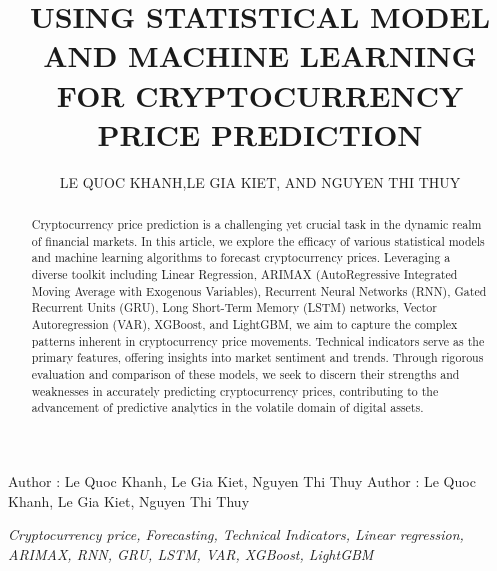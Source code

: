 \documentclass{ieeeojies}
\begin{document}
\title{\centering USING STATISTICAL MODEL AND MACHINE LEARNING FOR CRYPTOCURRENCY PRICE PREDICTION}

\author{\uppercase{Le Quoc Khanh},\uppercase{Le Gia Kiet, and Nguyen Thi Thuy}}

\address[1]{Faculty of Information Systems, University of Information Technology, (e-mail: 21520283@gm.uit.edu.vn)}
\address[2]{Faculty of Information Systems, University of Information Technology, (e-mail: 21522255@gm.uit.edu.vn)}
\address[3]{Faculty of Information Systems, University of Information Technology, (e-mail: 25122662@gm.uit.edu.vn)}

\markboth
{Author \headeretal: Le Quoc Khanh, Le Gia Kiet, Nguyen Thi Thuy}
{Author \headeretal: Le Quoc Khanh, Le Gia Kiet, Nguyen Thi Thuy}

\begin{abstract}
    Cryptocurrency price prediction is a challenging yet crucial task in the dynamic realm of financial markets. In this article, we explore the efficacy of various statistical models and machine learning algorithms to forecast cryptocurrency prices. Leveraging a diverse toolkit including Linear Regression, ARIMAX (AutoRegressive Integrated Moving Average with Exogenous Variables), Recurrent Neural Networks (RNN), Gated Recurrent Units (GRU), Long Short-Term Memory (LSTM) networks, Vector Autoregression (VAR), XGBoost, and LightGBM, we aim to capture the complex patterns inherent in cryptocurrency price movements. Technical indicators serve as the primary features, offering insights into market sentiment and trends. Through rigorous evaluation and comparison of these models, we seek to discern their strengths and weaknesses in accurately predicting cryptocurrency prices, contributing to the advancement of predictive analytics in the volatile domain of digital assets.
\end{abstract}

\begin{keywords}
    \textit{Cryptocurrency price, Forecasting, Technical Indicators, Linear regression, ARIMAX, RNN, GRU, LSTM, VAR, XGBoost, LightGBM}
\end{keywords}

\titlepgskip=-15pt

\maketitle
\end{document}
